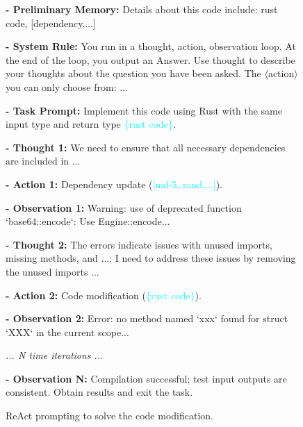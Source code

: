 \begin{figure}[ht]
  \centering
\begin{tcolorbox}[colframe=gray!50!white, 
 colback=white, 
 coltitle=black, 
 fonttitle=\bfseries,     
 left=1mm, 
 right=1mm]

\footnotesize
\textbf{- \textcolor{green!60!black}{Preliminary Memory:}} Details about this code include: {rust code}, {[dependency,...]}

\textbf{- \textcolor{green!60!black}{System Rule:}} You run in a thought, action, observation loop.
At the end of the loop, you output an Answer.
Use thought to describe your thoughts about the question you have been asked.
The $\langle$action$\rangle$ you can only choose from: ...

\textbf{- \textcolor{green!60!black}{Task Prompt:}} Implement this code using Rust with the same input type and return type \textcolor{cyan}{\{rust code\}}.

\textbf{- \textcolor{blue!70!black}{Thought 1:}} We need to ensure that all necessary dependencies are included in ...

\textbf{- \textcolor{blue!70!black}{Action 1:}} Dependency update (\textcolor{cyan}{[md-5, rand,...]}).

\textbf{- \textcolor{red!80!black}{Observation 1:}} Warning: use of deprecated function `base64::encode`: Use Engine::encode...

\medskip

\textbf{- \textcolor{blue!70!black}{Thought 2:}} The errors indicate issues with unused imports, missing methods, and ...; I need to address these issues by removing the unused imports ...

\textbf{- \textcolor{blue!70!black}{Action 2:}} Code modification (\textcolor{cyan}{\{rust code\}}).

\textbf{- \textcolor{red!80!black}{Observation 2:}} Error: no method named `xxx` found for struct `XXX` in the current scope...

\begin{center}
    \textit{... N time iterations ...}
\end{center}

\textbf{- \textcolor{red!80!black}{Observation N:}} Compilation successful; test input outputs are consistent. Obtain results and exit the task.

\end{tcolorbox}
\caption{ReAct prompting to solve the code modification.}
\label{box:react_prompt}
\end{figure}